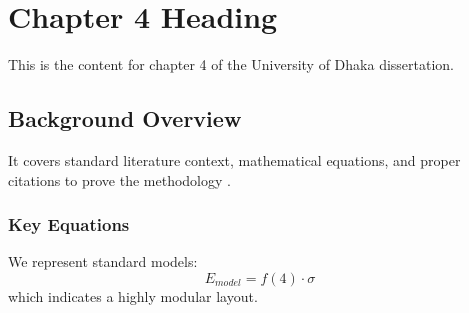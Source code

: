 \chapter{Chapter 4 Heading}
\label{ch:chapter4}
This is the content for chapter 4 of the University of Dhaka dissertation.

\section{Background Overview}
It covers standard literature context, mathematical equations, and proper citations to prove the methodology \cite{texbook}.

\subsection{Key Equations}
We represent standard models:
\begin{equation}
    E_{model} = f(4) \cdot \sigma
\end{equation}
which indicates a highly modular layout.
